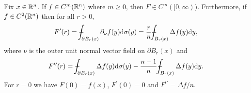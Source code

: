 \documentclass[11pt]{article}
\begin{document}
				\begin{lemma}\label{lem--sphericalmean}
					Fix $x\in\mathbb{R}^n$. If $f\in C^m(\mathbb{R}^n)$ where $m\ge0$, then $F\in C^m([0,\infty))$. Furthermore, if $f\in C^2(\mathbb{R}^n)$ then for all $r>0$,
					\begin{equation}\label{eq--sphericalmean2}
						F^\prime(r)=\dashint_{\partial B_r(x)}\partial_\nu f(y)\mathrm{d}\sigma(y)=\frac{r}{n}\dashint_{B_r(x)}\Delta f(y)\mathrm{d}y,
					\end{equation}
					where $\nu$ is the outer unit normal vector field on $\partial B_r(x)$ and
					\begin{equation}\label{eq--sphericalmean3}
						F^{\prime\prime}(r)=\dashint_{\partial B_r(x)}\Delta f(y)\mathrm{d}\sigma(y)-\frac{n-1}{n}\dashint_{B_r(x)}\Delta f(y)\mathrm{d}y.
					\end{equation} 
					For $r=0$ we have $F(0)=f(x)$, $F^\prime(0)=0$ and $F^{\prime\prime}=\Delta f/n$.
				\end{lemma}
\end{document}
